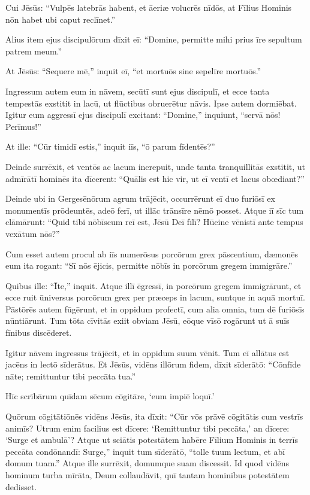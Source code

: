 \Versus Cui Jēsūs: ``Vulpēs latebrās habent, et āeriæ volucrēs nīdōs, at Fīlius Hominis nōn habet ubi caput reclīnet.'' 

\Versus Alius item ejus discipulōrum dīxit eī: ``Domine, permitte mihi prius īre sepultum patrem meum.'' 

\Versus At Jēsūs: ``Sequere mē,'' inquit eī, ``et mortuōs sine sepelīre mortuōs.''

\Versus Ingressum autem eum in nāvem, secūtī sunt ejus discipulī, 
\Versus et ecce tanta tempestās exstitit in lacū, ut flūctibus obruerētur nāvis. Ipse autem dormiēbat. 
\Versus Igitur eum aggressī ejus discipulī excitant: ``Domine,'' inquiunt, ``servā nōs! Perīmus!''

\Versus At ille: ``Cūr timidī estis,'' inquit iīs, ``ō parum fīdentēs?''

Deinde surrēxit, et ventōs ac lacum increpuit, unde tanta tranquillitās exstitit, 
\Versus ut admīrātī hominēs ita dīcerent: ``Quālis est hic vir, ut eī ventī et lacus obœdiant?''

\Versus Deinde ubi in Gergesēnōrum agrum trājēcit, occurrērunt eī duo furiōsī ex monumentīs prōdeuntēs, adeō ferī, ut illāc trānsīre nēmō posset. 
\Versus Atque iī sīc tum clāmārunt: ``Quid tibi nōbīscum reī est, Jēsū Deī fīlī? Hūcine vēnistī ante tempus vexātum nōs?'' 

\Versus Cum esset autem procul ab iīs numerōsus porcōrum grex pāscentium, 
\Versus dæmonēs eum ita rogant: ``Sī nōs ējicis, permitte nōbīs in porcōrum gregem immigrāre.'' 

\Versus Quibus ille: ``Īte,'' inquit. Atque illī ēgressī, in porcōrum gregem immigrārunt, et ecce ruit ūniversus porcōrum grex per præceps in lacum, suntque in aquā mortuī. 
\Versus Pāstōrēs autem fūgērunt, et in oppidum profectī, cum alia omnia, tum dē furiōsīs nūntiārunt. 
\Versus Tum tōta cīvitās exiit obviam Jēsū, eōque vīsō rogārunt ut ā suīs fīnibus discēderet.
 

\Caput
\Versus Igitur nāvem ingressus trājēcit, et in oppidum suum vēnit. 
\Versus Tum eī allātus est jacēns in lectō sīderātus. Et Jēsūs, vidēns illōrum fidem, dīxit sīderātō: ``Cōnfīde nāte; remittuntur tibi peccāta tua.''

\Versus Hīc scrībārum quīdam sēcum cōgitāre, `eum impiē loquī.'

\Versus Quōrum cōgitātiōnēs vidēns Jēsūs, ita dīxit: ``Cūr vōs prāvē cōgitātis cum vestrīs animīs? 
\Versus Utrum enim facilius est dīcere: `Remittuntur tibi peccāta,' an dīcere: `Surge et ambulā'? 
\Versus Atque ut sciātis potestātem habēre Fīlium Hominis in terrīs peccāta condōnandī: Surge,'' inquit tum sīderātō, ``tolle tuum lectum, et abī domum tuam.'' 
\Versus Atque ille surrēxit, domumque suam discessit. 
\Versus Id quod vidēns hominum turba mīrāta, Deum collaudāvit, quī tantam hominibus potestātem dedisset.

